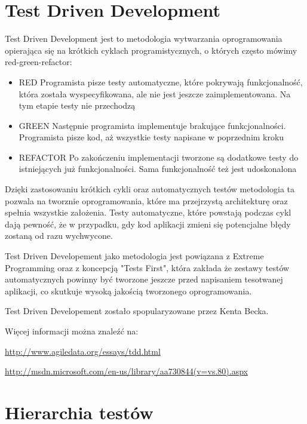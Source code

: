 \documentclass[brudnopis]{xmgr}
\begin{document}
\section{Test Driven Development}

Test Driven Development jest to metodologia wytwarzania oprogramowania opierająca się na krótkich cyklach programistycznych, o których często mówimy red-green-refactor:
\begin{itemize}
  \item RED Programista pisze testy automatyczne, które pokrywają funkcjonalność, która została wyspecyfikowana, ale nie jest jeszcze zaimplementowana. Na tym etapie testy nie przechodzą
  \item GREEN Następnie programista implementuje brakujące funkcjonalności. Programista pisze kod, aż wszystkie testy napisane w poprzednim kroku
  \item REFACTOR Po zakończeniu implementacji tworzone są dodatkowe testy do istniejących już funkcjonalności. Sama funkcjonalność też jest udoskonalona
\end{itemize}

Dzięki zastosowaniu krótkich cykli oraz automatycznych testów metodologia ta pozwala na tworznie oprogramowania, które ma przejrzystą architekturę oraz spełnia wszystkie założenia. Testy automatyczne, które powstają podczas cykl dają pewność, że w przypadku, gdy kod aplikacji zmieni się potencjalne błędy zostaną od razu wychwycone. 

Test Driven Developement jako metodologia jest powiązana z Extreme Programming oraz z koncepcją "Tests First", która zakłada że zestawy testów automatycznych powinny być tworzone jeszcze przed napisaniem tesotwanej aplikacji, co skutkuje wysoką jakością tworzonego oprogramowania.   

Test Driven Developement zostało spopularyzowane przez Kenta Becka.

Więcej informacji można znaleźć na:

\url{http://www.agiledata.org/essays/tdd.html}

\url{http://msdn.microsoft.com/en-us/library/aa730844(v=vs.80).aspx}

\section{Hierarchia testów}
\end{document}
